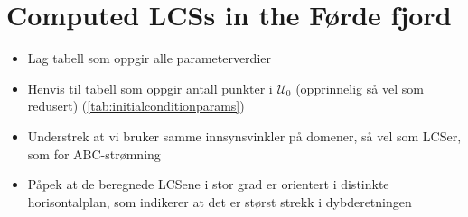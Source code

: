 \section{Computed LCSs in the Førde fjord}
\label{sec:computed_lcss_in_the_forde_fjord}

\begin{framed}
    \begin{itemize}
        \item Lag tabell som oppgir alle parameterverdier
        \item Henvis til tabell som oppgir antall punkter i $\mathcal{U}_{0}$ (opprinnelig så vel som redusert) (\cref{tab:initialconditionparams})
        \item Understrek at vi bruker samme innsynsvinkler på domener,
            så vel som LCSer, som for ABC-strømning
        \item Påpek at de beregnede LCSene i stor grad er orientert
            i distinkte horisontalplan, som indikerer at det er
            størst strekk i dybderetningen
    \end{itemize}
\end{framed}





